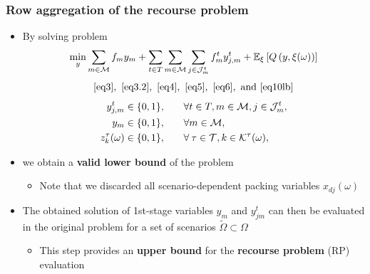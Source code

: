 \documentclass[9pt,xcolor={dvipsnames}]{beamer}
\begin{document}
\begin{frame}%
	\frametitle{Row aggregation of the recourse problem}
	\begin{itemize}
		\item<1-> By solving problem
		{
		\small
		\begin{equation*}
		\min_{y} \sum\limits_{m \in \cal M} {f_{m}}y_{m} +  \sum\limits_{t \in T} \sum\limits_{m \in {{\cal M}}} \sum\limits_{j \in {\cal J}_{m}^t} f_{m}^t y_{j,m}^t  + {\mathbb{E}}_{\xi}\left[Q \left(y,\xi(\omega)\right)\right] 
		\end{equation*}
		\begin{equation*}
			\eqref{eq3},~\eqref{eq3.2},~\eqref{eq4},~\eqref{eq5},~\eqref{eq6},~\text{and}~\eqref{eq10lb}
		\end{equation*}
		\begin{alignat*}{2}
		y_{j,m}^t \in \{0, 1\}, & \qquad \forall t \in T, m \in {\cal M}, j \in {\cal J}^t_{m}, \\
		y_{m} \in \{0, 1\}, & \qquad \forall m \in \cal M, \\
		z_k^{\tau}(\omega) \in \{0, 1\}, & \qquad \forall \: \tau \in {\cal T}, k \in {\cal K}^{\tau}(\omega),
		\end{alignat*}
		}
        \item<2->{we obtain a \textbf{valid lower bound} of the problem}
        \begin{itemize}
		      \item<3-> Note that we discarded all scenario-dependent packing variables $ x_{dj}(\omega)$
        \end{itemize}
		\bigskip
		\item<4-> The obtained solution of 1st-stage variables $ y_m$ and $y^t_{jm}$ can then be evaluated in the original problem for a set of scenarios $ \tilde{\Omega} \subset \Omega$
		\begin{itemize}
			\item<5-> This step provides an \textbf{upper bound} for the \textbf{recourse problem} (RP) evaluation
		\end{itemize}
	\end{itemize}
\end{frame}
\end{document}
